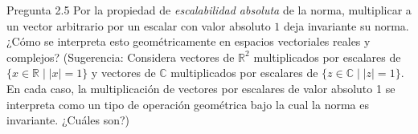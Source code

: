 \documentclass[12pt,dvipsnames]{article}
\numberwithin{equation}{section}
\begin{document}
Pregunta 2.5 Por la propiedad de \emph{escalabilidad absoluta} de la norma, multiplicar a un vector arbitrario por un escalar con valor absoluto $1$ deja invariante su norma. ¿Cómo se interpreta esto geométricamente en espacios vectoriales reales y complejos? (Sugerencia: Considera vectores de $\mathbb{R}^2$ multiplicados por escalares de $\{x\in \mathbb{R} \mid |x| = 1\}$ y vectores de $\mathbb{C}$ multiplicados por escalares de $\{z\in\mathbb{C} \mid |z|=1\}$. En cada caso, la multiplicación de vectores por escalares de valor absoluto 1 se interpreta como un tipo de operación geométrica bajo la cual la norma es invariante. ¿Cuáles son?)
\end{document}
